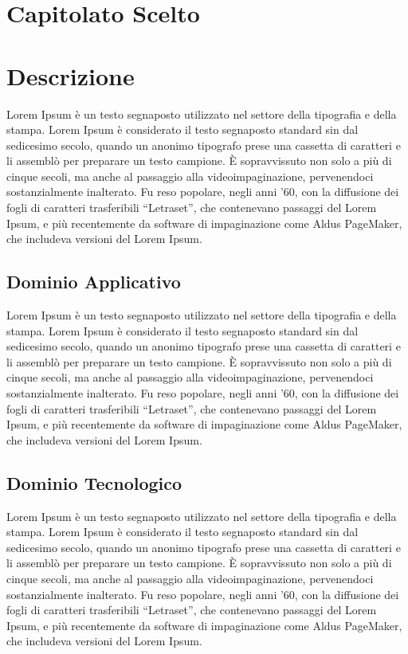 \section{Capitolato Scelto}
\section{Descrizione}
Lorem Ipsum è un testo segnaposto utilizzato nel settore della tipografia e della stampa. Lorem Ipsum è considerato il testo segnaposto standard sin dal sedicesimo secolo, quando un anonimo tipografo prese una cassetta di caratteri e li assemblò per preparare un testo campione. È sopravvissuto non solo a più di cinque secoli, ma anche al passaggio alla videoimpaginazione, pervenendoci sostanzialmente inalterato. Fu reso popolare, negli anni ’60, con la diffusione dei fogli di caratteri trasferibili “Letraset”, che contenevano passaggi del Lorem Ipsum, e più recentemente da software di impaginazione come Aldus PageMaker, che includeva versioni del Lorem Ipsum.

\subsection{Dominio Applicativo}
Lorem Ipsum è un testo segnaposto utilizzato nel settore della tipografia e della stampa. Lorem Ipsum è considerato il testo segnaposto standard sin dal sedicesimo secolo, quando un anonimo tipografo prese una cassetta di caratteri e li assemblò per preparare un testo campione. È sopravvissuto non solo a più di cinque secoli, ma anche al passaggio alla videoimpaginazione, pervenendoci sostanzialmente inalterato. Fu reso popolare, negli anni ’60, con la diffusione dei fogli di caratteri trasferibili “Letraset”, che contenevano passaggi del Lorem Ipsum, e più recentemente da software di impaginazione come Aldus PageMaker, che includeva versioni del Lorem Ipsum.

\subsection{Dominio Tecnologico}
Lorem Ipsum è un testo segnaposto utilizzato nel settore della tipografia e della stampa. Lorem Ipsum è considerato il testo segnaposto standard sin dal sedicesimo secolo, quando un anonimo tipografo prese una cassetta di caratteri e li assemblò per preparare un testo campione. È sopravvissuto non solo a più di cinque secoli, ma anche al passaggio alla videoimpaginazione, pervenendoci sostanzialmente inalterato. Fu reso popolare, negli anni ’60, con la diffusione dei fogli di caratteri trasferibili “Letraset”, che contenevano passaggi del Lorem Ipsum, e più recentemente da software di impaginazione come Aldus PageMaker, che includeva versioni del Lorem Ipsum.

